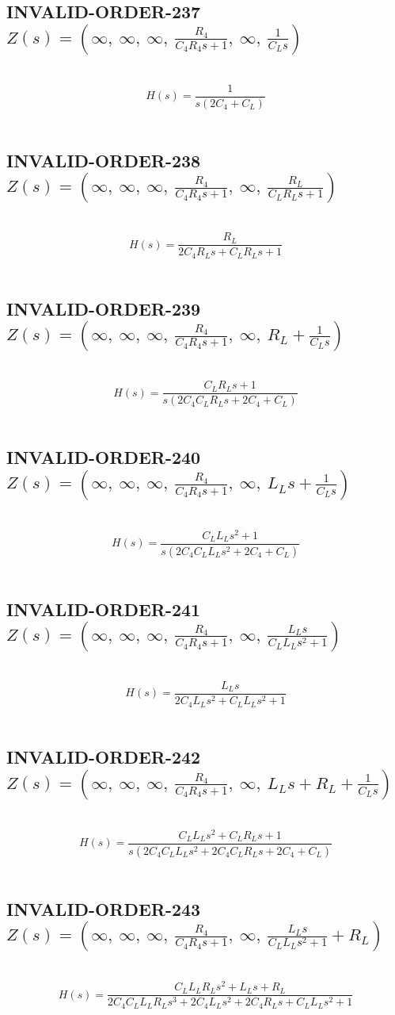 \documentclass{article}
\begin{document}
\subsection{INVALID-ORDER-237 $Z(s) = \left( \infty, \  \infty, \  \infty, \  \frac{R_{4}}{C_{4} R_{4} s + 1}, \  \infty, \  \frac{1}{C_{L} s}\right)$ } \ 
\textbf{\[H(s) = \frac{1}{s \left(2 C_{4} + C_{L}\right)}\] } \ 
\subsection{INVALID-ORDER-238 $Z(s) = \left( \infty, \  \infty, \  \infty, \  \frac{R_{4}}{C_{4} R_{4} s + 1}, \  \infty, \  \frac{R_{L}}{C_{L} R_{L} s + 1}\right)$ } \ 
\textbf{\[H(s) = \frac{R_{L}}{2 C_{4} R_{L} s + C_{L} R_{L} s + 1}\] } \ 
\subsection{INVALID-ORDER-239 $Z(s) = \left( \infty, \  \infty, \  \infty, \  \frac{R_{4}}{C_{4} R_{4} s + 1}, \  \infty, \  R_{L} + \frac{1}{C_{L} s}\right)$ } \ 
\textbf{\[H(s) = \frac{C_{L} R_{L} s + 1}{s \left(2 C_{4} C_{L} R_{L} s + 2 C_{4} + C_{L}\right)}\] } \ 
\subsection{INVALID-ORDER-240 $Z(s) = \left( \infty, \  \infty, \  \infty, \  \frac{R_{4}}{C_{4} R_{4} s + 1}, \  \infty, \  L_{L} s + \frac{1}{C_{L} s}\right)$ } \ 
\textbf{\[H(s) = \frac{C_{L} L_{L} s^{2} + 1}{s \left(2 C_{4} C_{L} L_{L} s^{2} + 2 C_{4} + C_{L}\right)}\] } \ 
\subsection{INVALID-ORDER-241 $Z(s) = \left( \infty, \  \infty, \  \infty, \  \frac{R_{4}}{C_{4} R_{4} s + 1}, \  \infty, \  \frac{L_{L} s}{C_{L} L_{L} s^{2} + 1}\right)$ } \ 
\textbf{\[H(s) = \frac{L_{L} s}{2 C_{4} L_{L} s^{2} + C_{L} L_{L} s^{2} + 1}\] } \ 
\subsection{INVALID-ORDER-242 $Z(s) = \left( \infty, \  \infty, \  \infty, \  \frac{R_{4}}{C_{4} R_{4} s + 1}, \  \infty, \  L_{L} s + R_{L} + \frac{1}{C_{L} s}\right)$ } \ 
\textbf{\[H(s) = \frac{C_{L} L_{L} s^{2} + C_{L} R_{L} s + 1}{s \left(2 C_{4} C_{L} L_{L} s^{2} + 2 C_{4} C_{L} R_{L} s + 2 C_{4} + C_{L}\right)}\] } \ 
\subsection{INVALID-ORDER-243 $Z(s) = \left( \infty, \  \infty, \  \infty, \  \frac{R_{4}}{C_{4} R_{4} s + 1}, \  \infty, \  \frac{L_{L} s}{C_{L} L_{L} s^{2} + 1} + R_{L}\right)$ } \ 
\textbf{\[H(s) = \frac{C_{L} L_{L} R_{L} s^{2} + L_{L} s + R_{L}}{2 C_{4} C_{L} L_{L} R_{L} s^{3} + 2 C_{4} L_{L} s^{2} + 2 C_{4} R_{L} s + C_{L} L_{L} s^{2} + 1}\] } \ 
\end{document}
